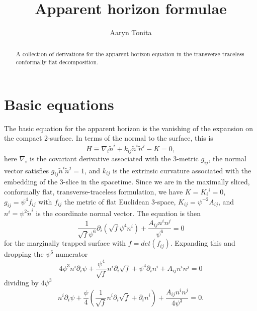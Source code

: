 \documentclass[a4paper,10pt]{article}
\title{Apparent horizon formulae}
\author{Aaryn Tonita}
\begin{document}
\maketitle

\begin{abstract}
A collection of derivations for the apparent horizon equation in the transverse traceless conformally flat decomposition.
\end{abstract}

\section{Basic equations}
The basic equation for the apparent horizon is the vanishing of the expansion on the compact 2-surface. In terms of the normal to the surface, this is
\begin{equation}
 H \equiv \nabla_i \tilde{n}^i + k_{ij}\tilde{n}^i\tilde{n}^j - K = 0,
\end{equation}
here $\nabla_i$ is the covariant derivative associated with the 3-metric $g_{ij}$, the normal vector satisfies $g_{ij}\tilde{n}^i\tilde{n}^j = 1$, and $k_{ij}$ is the extrinsic curvature associated with the embedding of the 3-slice in the spacetime. Since we are in the maximally sliced, conformally flat, transverse-traceless formulation, we have $K=K_i{}^i = 0$, $g_{ij}=\psi^4 f_{ij}$ with $f_{ij}$ the metric of flat Euclidean 3-space, $K_{ij} = \psi^{-2} A_{ij}$, and $n^i = \psi^{2}\tilde{n}^i$ is the coordinate normal vector. The equation is then
\begin{equation}
 \frac{1}{\sqrt{f}\psi^6}\partial_i\left( \sqrt{f}\psi^4 n^i \right) + \frac{A_{ij}n^in^j}{\psi^6} = 0
\end{equation}
for the marginally trapped surface with $f = det(f_{ij})$. Expanding this and dropping the $\psi^6$ numerator
\begin{equation}
 4\psi^3 n^i\partial_i \psi + \frac{\psi^4}{\sqrt{f}}n^i\partial_i \sqrt{f} + \psi^4\partial_i n^i + A_{ij}n^in^j = 0
\end{equation}
dividing by $4 \psi^3$
\begin{equation}
 n^i\partial_i\psi + \frac{\psi}{4}\left( \frac{1}{\sqrt{f}}n^i\partial_i\sqrt{f} + \partial_in^i\right) + \frac{A_{ij}n^in^j}{4\psi^3} = 0. 
\end{equation}
\end{document}

